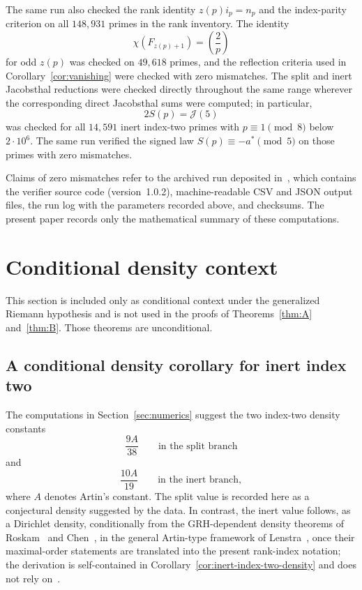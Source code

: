 \documentclass[11pt]{amsart}
\theoremstyle{plain}
\theoremstyle{definition}
\newcommand{\Jac}{\mathcal{J}}
\begin{document}
The same run also checked the rank identity \(z(p)i_p=n_p\) and the
index-parity criterion on all \(148{,}931\) primes in the rank
inventory.  The identity
\[
  \chi(F_{z(p)+1})=\left(\frac2p\right)
\]
for odd \(z(p)\) was checked on \(49{,}618\) primes, and the reflection
criteria used in Corollary~\ref{cor:vanishing} were checked with zero
mismatches.  The split and inert Jacobsthal reductions were checked
directly throughout the same range wherever the corresponding direct
Jacobsthal sums were computed; in particular,
\[
  2S(p)=\Jac(5)
\]
was checked for all \(14{,}591\) inert index-two primes with
\(p\equiv1\pmod8\) below \(2\cdot10^{6}\).  The same run verified the
signed law \(S(p)\equiv-a^{*}\pmod5\) on those primes with zero
mismatches.

Claims of zero mismatches refer to the archived run deposited
in~\cite{ghandaliIndex2Archive}, which contains the verifier source code
(version~1.0.2), machine-readable CSV and JSON output files, the run log
with the parameters recorded above, and checksums.  The present paper
records only the mathematical summary of these computations.

\section{Conditional density context}\label{sec:context}

This section is included only as conditional context under the
generalized Riemann hypothesis and is not used in the proofs of
Theorems~\ref{thm:A} and~\ref{thm:B}. Those theorems are unconditional.

\subsection{A conditional density corollary for inert index two}\label{sec:density}

The computations in Section~\ref{sec:numerics} suggest the two index-two
density constants
\[
  \frac{9A}{38}\qquad\text{in the split branch}
\]
and
\[
  \frac{10A}{19}\qquad\text{in the inert branch},
\]
where \(A\) denotes Artin's constant.  The split value is recorded here
as a conjectural density suggested by the data. In contrast, the inert value follows, as a Dirichlet density, conditionally from the
GRH-dependent density theorems of Roskam~\cite{Roskam2000} and
Chen~\cite{Chen2002}, in the general Artin-type framework of
Lenstra~\cite{Lenstra1977}, once their maximal-order statements are
translated into the present rank-index notation; the derivation is
self-contained in Corollary~\ref{cor:inert-index-two-density} and does
not rely on~\cite{Ghandali2026Preprint}.
\end{document}
